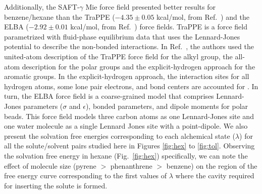 \documentclass[preprint]{elsarticle}
\begin{document}
	Additionally, the SAFT-$\gamma$ Mie force field presented better results for benzene/hexane than the TraPPE ($- 4.35 \pm 0.05$ kcal/mol, from Ref.~) and the ELBA ($-2.92 \pm 0.01$ kcal/mol, from Ref.~) force fields.
	TraPPE is a force field parametrized with fluid-phase equilibrium data that uses the Lennard-Jones potential to describe the non-bonded interactions. In Ref.~, the authors used the united-atom description of the TraPPE force field for the alkyl group, the all-atom description for the polar groups and the explicit-hydrogen approach for the aromatic groups. In the explicit-hydrogen approach, the interaction sites for all hydrogen atoms, some lone pair electrons, and bond centers are accounted for \cite{doi:10.1021/jp073586l}. In turn, the ELBA force field is a coarse-grained model that comprises Lennard-Jones parameters ($\sigma$ and $\epsilon$), bonded parameters, and dipole moments for polar beads. This force field models three carbon atoms as one Lennard-Jones site and one water molecule as a single Lennard Jones site with a point-dipole. We also present the solvation free energies corresponding to each alchemical state ($\lambda$) for all the solute/solvent pairs studied here in Figures \ref{fig:hex} to \ref{fig:tol}. Observing the solvation free energy in hexane (Fig.~\ref{fig:hex}) specifically, we can note the effect of molecule size (pyrene $>$ phenanthrene $>$ benzene) on the region of the free energy curve corresponding to the first values of $\lambda$ where the cavity required for inserting the solute is formed.
	
\end{document}
